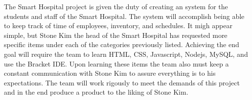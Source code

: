 The Smart Hospital project is given the duty of creating an system for the students and staff of the Smart Hospital. The system will accomplish being able to keep track of time of employees, inventory, and schedules. It migh appear simple, but Stone Kim the head of the Smart Hospital has requested more specific items under each of the categories previously listed. Achieving the end goal will require the team to learn HTML, CSS, Javascript, Nodejs, MySQL, and use the Bracket IDE. Upon learning these items the team also must keep a constant communication with Stone Kim to assure everything is to his expectations. The team will work rigously to meet the demands of this project and in the end produce a product to the liking of Stone Kim.
